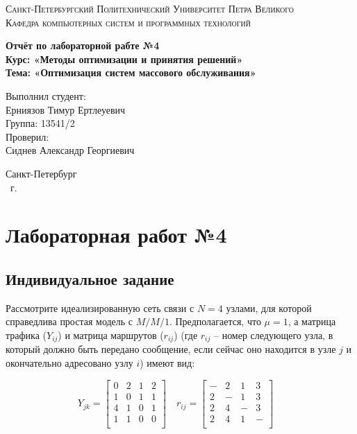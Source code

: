 \documentclass[14pt,a4paper,report]{report}
\begin{document}
\def\contentsname{Содержание}

\begin{titlepage}
	\begin{center}
		\textsc{Санкт-Петербургский Политехнический 
			Университет Петра Великого\\[5mm]
			Кафедра компьютерных систем и программных технологий}
		
		\vfill
		
		\textbf{Отчёт по лабораторной рабте №4\\[3mm]
			Курс: «Методы оптимизации и принятия решений»\\[3mm]
			Тема: «Оптимизация систем массового обслуживания»\\[35mm]
			}
	\end{center}
	
	\hfill
	\begin{minipage}{.5\textwidth}
		Выполнил студент:\\[2mm] 
		Ерниязов Тимур Ертлеуевич\\
		Группа: 13541/2\\[5mm]
		
		Проверил:\\[2mm] 
		Сиднев Александр Георгиевич
	\end{minipage}
	\vfill
	\begin{center}
		Санкт-Петербург\\ \the\year\ г.
	\end{center}
\end{titlepage}

\tableofcontents
\clearpage

\chapter{Лабораторная работ №4}

\section{Индивидуальное задание}

Рассмотрите идеализированную сеть связи с $N=4$ узлами, для которой справедлива простая модель с $M/M/1$. Предполагается, что $\mu =1$, а матрица трафика ($Y_{ij}$) и матрица маршрутов ($r_{ij}$) (где $r_{ij}$ – номер следующего узла, в который должно быть передано сообщение, если сейчас оно находится в узле $j$ и окончательно адресовано узлу $i$) имеют вид:


$$Y_{jk} = 
\begin{bmatrix} 
0 & 2 & 1 & 2 \\
1 & 0 & 1 & 1 \\
4 & 1 & 0 & 1 \\
1 & 1 & 0 & 0 \\
\end{bmatrix}
\quad 
r_{ij} = 
\begin{bmatrix} 
- & 2 & 1 & 3 \\
2 & - & 1 & 3 \\
2 & 4 & - & 3 \\
2 & 4 & 1 & - \\
\end{bmatrix}
\quad $$
\end{document}
